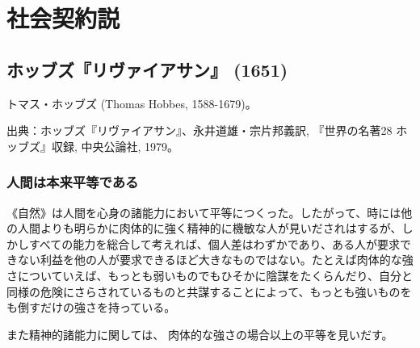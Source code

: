 
\chapter{社会契約説}



\section{ホッブズ『リヴァイアサン』 (1651)}




トマス・ホッブズ (Thomas Hobbes, 1588-1679)。

出典：ホッブズ『リヴァイアサン』、永井道雄・宗片邦義訳, 『世界の名著28 ホッブズ』収録, 中央公論社, 1979。














\subsection{人間は本来平等である}



《自然》は人間を心身の諸能力において平等につくった。したがって、時には他の人間よりも明らかに肉体的に強く精神的に機敏な人が見いだされはするが、しかしすべての能力を総合して考えれば、個人差はわずかであり、ある人が要求できない利益を他の人が要求できるほど大きなものではない。たとえば肉体的な強さについていえば、もっとも弱いものでもひそかに陰謀をたくらんだり、自分と同様の危険にさらされているものと共謀することによって、もっとも強いものをも倒すだけの強さを持っている。



また精神的諸能力に関しては、
肉体的な強さの場合以上の平等を見いだす。




